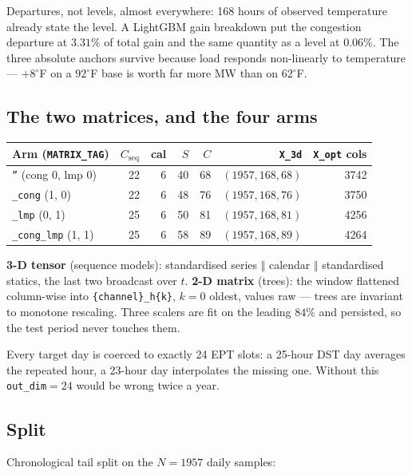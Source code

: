 \documentclass[11pt]{article}
\newcommand{\code}[1]{\texttt{\small #1}}
\begin{document}
\noindent
Departures, not levels, almost everywhere: 168 hours of observed temperature
already state the level. A LightGBM gain breakdown put the congestion departure
at $3.31\%$ of total gain and the same quantity as a level at $0.06\%$.
The three absolute anchors survive because load responds non-linearly to
temperature --- $+8^\circ$F on a $92^\circ$F base is worth far more MW than on
$62^\circ$F.

\subsection{The two matrices, and the four arms}

\begin{center}\small
\begin{tabular}{@{}lrrrrrr@{}}
\toprule
Arm (\code{MATRIX\_TAG}) & $C_{\text{seq}}$ & cal & $S$ & $C$ & \code{X\_3d} & \code{X\_opt} cols \\
\midrule
\code{''} \hfill (cong 0, lmp 0) & 22 & 6 & 40 & 68 & $(1957,168,68)$ & 3742 \\
\code{\_cong} \hfill (1, 0)      & 22 & 6 & 48 & 76 & $(1957,168,76)$ & 3750 \\
\code{\_lmp} \hfill (0, 1)       & 25 & 6 & 50 & 81 & $(1957,168,81)$ & 4256 \\
\code{\_cong\_lmp} \hfill (1, 1) & 25 & 6 & 58 & 89 & $(1957,168,89)$ & 4264 \\
\bottomrule
\end{tabular}
\end{center}

\noindent
\textbf{3-D tensor} (sequence models): standardised series $\Vert$ calendar
$\Vert$ standardised statics, the last two broadcast over $t$.
\textbf{2-D matrix} (trees): the window flattened column-wise into
\code{\{channel\}\_h\{k\}}, $k=0$ oldest, values raw --- trees are invariant to
monotone rescaling. Three scalers are fit on the leading $84\%$ and persisted, so
the test period never touches them.

\noindent
Every target day is coerced to exactly 24 EPT slots: a 25-hour DST day averages
the repeated hour, a 23-hour day interpolates the missing one. Without this
\code{out\_dim}$=24$ would be wrong twice a year.

\subsection{Split}

Chronological tail split on the $N = 1957$ daily samples:
\end{document}
